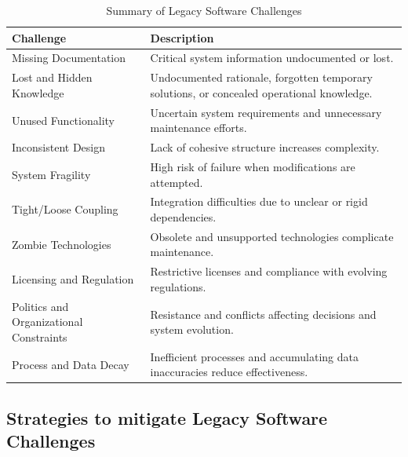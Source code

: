 \begin{table}[htbp]
\centering
\begin{tabular}{|l|p{8cm}|}
\hline
\textbf{Challenge} & \textbf{Description} \\
\hline
Missing Documentation & Critical system information undocumented or lost. \\ \hline
Lost and Hidden Knowledge & Undocumented rationale, forgotten temporary solutions, or concealed operational knowledge. \\ \hline
Unused Functionality & Uncertain system requirements and unnecessary maintenance efforts. \\ \hline
Inconsistent Design & Lack of cohesive structure increases complexity. \\ \hline
System Fragility & High risk of failure when modifications are attempted. \\ \hline
Tight/Loose Coupling & Integration difficulties due to unclear or rigid dependencies. \\ \hline
Zombie Technologies & Obsolete and unsupported technologies complicate maintenance. \\ \hline
Licensing and Regulation & Restrictive licenses and compliance with evolving regulations. \\ \hline
Politics and Organizational Constraints & Resistance and conflicts affecting decisions and system evolution. \\ \hline
Process and Data Decay & Inefficient processes and accumulating data inaccuracies reduce effectiveness. \\ \hline
\end{tabular}
\caption{Summary of Legacy Software Challenges \citep{annettWorkingLegacySystems2019}}
\label{tab:legacy_issues}
\end{table}

\newpage
\subsection{Strategies to mitigate Legacy Software Challenges}

